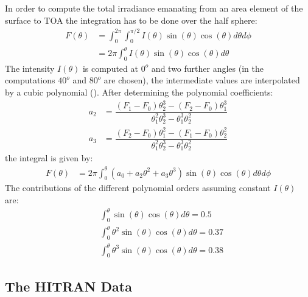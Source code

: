 In order to compute the total irradiance emanating from an area element of the surface to TOA the integration has to be done over the half sphere:
\begin{align}
	F(\theta) &= \int_0^{2 \pi} \int_0^{\pi/2} I(\theta) \sin(\theta) \cos(\theta)  d \theta d \phi \\
	  &= 2 \pi \int_0^{\theta} I(\theta) \sin(\theta) \cos(\theta) d \theta
\end{align}
The intensity $I(\theta)$ is computed at $0^o$ and two further angles (in the computations $40^o$ and $80^o$ are chosen), 
the intermediate values are interpolated by a cubic polynomial ().
After determining the polynomial coefficients:
\begin{align}
	a_2 &= \dfrac{(F_1 - F_0) \theta_2^3 - (F_2 - F_0) \theta_1^3}{\theta_1^2 \theta_2^3 - \theta_1^3 \theta_2^2} \\
	a_3 &= \dfrac{(F_2 - F_0) \theta_1^2 - (F_1 - F_0) \theta_2^2}{\theta_1^2 \theta_2^3 - \theta_1^3 \theta_2^2}
 \end{align}  
the integral is given by:
\begin{align}
	F(\theta) &= 2 \pi \int_0^{\theta} \left(a_0 + a_2 \theta^2 + a_3 \theta^3\right) \sin(\theta) \cos(\theta)  d \theta d \phi
\end{align}
The contributions of the different polynomial orders assuming constant $I(\theta)$ are:
\begin{align*}
	 &\int_0^{\theta} \sin(\theta) \cos(\theta) d \theta = 0.5 \\
	 &\int_0^{\theta} \theta^2 \sin(\theta) \cos(\theta) d \theta = 0.37  \\
	 &\int_0^{\theta} \theta^3 \sin(\theta) \cos(\theta) d \theta = 0.38
\end{align*}

\subsection{The HITRAN Data}

